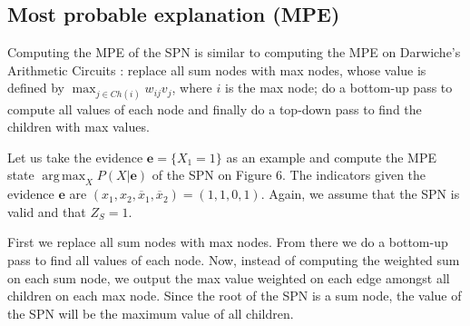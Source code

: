\documentclass[a4paper,10pt]{article}
\DeclareMathOperator*{\argmax}{arg\,max}
\theoremstyle{plain}
\begin{document}
\begin{figure}[h]
\end{figure}

\subsection{Most probable explanation (MPE)}

Computing the MPE of the SPN is similar to computing the MPE on Darwiche's Arithmetic Circuits
\cite{diff-approach-darwiche}: replace all sum nodes with max nodes, whose value is defined by
$\max_{j\in Ch(i)}w_{ij}v_j$, where $i$ is the max node; do a bottom-up pass to compute all values
of each node and finally do a top-down pass to find the children with max values.

Let us take the evidence $\mathbf{e}=\{X_1=1\}$ as an example and compute the MPE state
$\argmax_X P(X|\mathbf{e})$ of the SPN on Figure 6. The indicators given the evidence $\mathbf{e}$
are $(x_1,x_2,\overline{x}_1,\overline{x}_2)=(1,1,0,1)$. Again, we assume that the SPN is valid and
that $Z_S=1$.

First we replace all sum nodes with max nodes. From there we do a bottom-up pass to find all values
of each node. Now, instead of computing the weighted sum on each sum node, we output the max value
weighted on each edge amongst all children on each max node. Since the root of the SPN is a sum
node, the value of the SPN will be the maximum value of all children.
\end{document}
